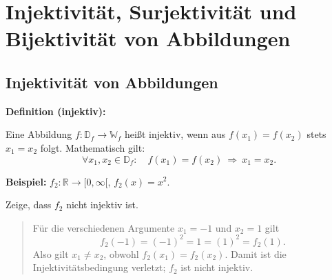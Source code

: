 
\section{Injektivität, Surjektivität und Bijektivität von Abbildungen}

\subsection{Injektivität von Abbildungen}

\textbf{Definition (injektiv):}

Eine Abbildung $f:\mathbb{D}_f\longrightarrow\mathbb{W}_f$
heißt injektiv, wenn aus $f(x_1)=f(x_2)$ stets
$x_1=x_2$ folgt. Mathematisch gilt:
\[
\forall x_1,x_2\in\mathbb{D}_f:\quad
f(x_1)=f(x_2)\ \Longrightarrow\ x_1=x_2.
\]

\textbf{Beispiel:} $f_2:\mathbb{R}\longrightarrow[0,\infty[$,
$f_2(x)=x^2$.

Zeige, dass $f_2$ nicht injektiv ist.
\begin{quote}
Für die verschiedenen Argumente $x_1=-1$ und $x_2=1$ gilt
\[
f_2(-1)=(-1)^2=1=(1)^2=f_2(1).
\]
Also gilt $x_1\neq x_2$, obwohl $f_2(x_1)=f_2(x_2)$.
Damit ist die Injektivitätsbedingung verletzt;
$f_2$ ist nicht injektiv.
\end{quote}

